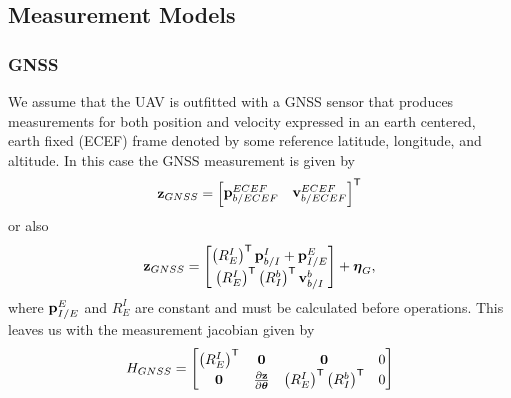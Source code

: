 \documentclass[a4paper]{article}
\begin{document}
\subsection{Measurement Models}

\subsubsection{GNSS}
We assume that the UAV is outfitted with a GNSS sensor that produces
measurements for both position and velocity expressed in an earth centered, earth
fixed (ECEF) frame denoted by some reference latitude, longitude, and altitude.
In this case the GNSS measurement is given by
\begin{equation}
  \boldsymbol{\mathrm{z}}_{GNSS} = 
  \begin{bmatrix}
    \boldsymbol{\mathrm{p}}_{b/ECEF}^{ECEF} & \boldsymbol{\mathrm{v}}_{b/ECEF}^{ECEF}
  \end{bmatrix}^{\mathsf{T}}
\end{equation}
or also
\begin{equation}
	\boldsymbol{\mathrm{z}}_{GNSS} = 
	\begin{bmatrix}
		\left(R_E^I\right)^{\mathsf{T}} \boldsymbol{\mathrm{p}}_{b/I}^I + \boldsymbol{\mathrm{p}}_{I/E}^E \\
		\left(R_E^I\right)^{\mathsf{T}} \left(R_I^b\right)^{\mathsf{T}}\boldsymbol{\mathrm{v}}_{b/I}^b \\
	\end{bmatrix} + \boldsymbol{\mathrm{\eta}}_G,
\end{equation}
where $\boldsymbol{\mathrm{p}}_{I/E}^E$ and $R_E^I$ are constant and must be calculated before operations.
This leaves us with the measurement jacobian given by
\begin{equation}
  H_{GNSS} =
  \begin{bmatrix}
    \left(R_E^I\right)^{\mathsf{T}} & \boldsymbol{\mathrm{0}} & \boldsymbol{\mathrm{0}} & 0 \\
    \boldsymbol{\mathrm{0}} & \frac{\partial \boldsymbol{\mathrm{z}}}{\partial \boldsymbol{\mathrm{\theta}}} & \left(R_E^I\right)^{\mathsf{T}}
      \left(R_I^b\right)^{\mathsf{T}} & 0
  \end{bmatrix}
\end{equation}
\end{document}
